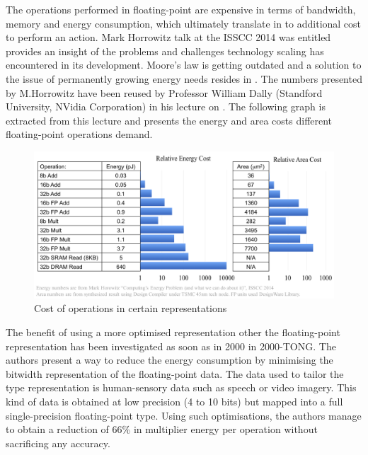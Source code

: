 The operations performed in floating-point are expensive in terms of bandwidth, memory and energy consumption, which ultimately translate in to additional cost to perform an action. Mark Horrowitz talk at the ISSCC 2014 was entitled  provides an insight of the problems and challenges technology scaling has encountered in its development. Moore's law is getting outdated and a solution to the issue of permanently growing energy needs resides in . The numbers presented by M.Horrowitz have been reused by Professor William Dally (Standford University, NVidia Corporation) in his lecture on  \cite{Nips2015}. The following graph is extracted from this lecture and presents the energy and area costs different floating-point operations demand.

\begin{figure}[htbp]
	\centering
		\includegraphics[width=15cm]{Figures/OpCosts.png}
	\caption[Operation costs]{Cost of operations in certain representations \cite{Nips2015,Horrowitz2014}}
	\label{fig:OpCosts}
\end{figure}

The benefit of using a more optimised representation other the floating-point representation has been investigated as soon as in 2000 in 2000-TONG. The authors present a way to reduce the energy consumption by minimising the bitwidth representation of the floating-point data. The data used to tailor the type representation is human-sensory data such as speech or video imagery. This kind of data is obtained at low precision (4 to 10 bits) but mapped into a full single-precision floating-point type. Using such optimisations, the authors manage to obtain a reduction of 66\% in multiplier energy per operation without sacrificing any accuracy.

